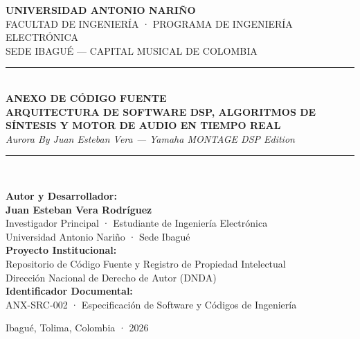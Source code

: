 \documentclass[11pt,a4paper]{article}
\begin{document}
\begin{titlepage}
    \centering
    \vspace*{0.5cm}
    
    {\scshape\LARGE \textbf{UNIVERSIDAD ANTONIO NARIÑO}}\\[0.3cm]
    {\scshape\large FACULTAD DE INGENIERÍA · PROGRAMA DE INGENIERÍA ELECTRÓNICA}\\[0.15cm]
    {\small SEDE IBAGUÉ — CAPITAL MUSICAL DE COLOMBIA}\\[1.5cm]
    
    \rule{\linewidth}{1.8pt}\\[0.4cm]
    {\Huge \bfseries \textcolor{uanblue}{ANEXO DE CÓDIGO FUENTE}}\\[0.35cm]
    {\Large \bfseries ARQUITECTURA DE SOFTWARE DSP, ALGORITMOS DE SÍNTESIS Y MOTOR DE AUDIO EN TIEMPO REAL}\\[0.25cm]
    {\large \itshape Aurora By Juan Esteban Vera — Yamaha MONTAGE DSP Edition}\\[0.4cm]
    \rule{\linewidth}{1.8pt}\\[2.0cm]
    
    \begin{minipage}{0.85\textwidth}
        \large
        \textbf{Autor y Desarrollador:}\\[0.15cm]
        \textbf{Juan Esteban Vera Rodríguez}\\
        Investigador Principal · Estudiante de Ingeniería Electrónica\\
        Universidad Antonio Nariño · Sede Ibagué\\[0.8cm]
        
        \textbf{Proyecto Institucional:}\\
        Repositorio de Código Fuente y Registro de Propiedad Intelectual\\
        Dirección Nacional de Derecho de Autor (DNDA)\\[0.8cm]
        
        \textbf{Identificador Documental:}\\
        ANX-SRC-002 · Especificación de Software y Códigos de Ingeniería
    \end{minipage}
    
    \vfill
    {\large Ibagué, Tolima, Colombia · 2026}
\end{titlepage}
\end{document}
